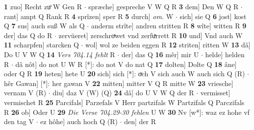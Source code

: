 \documentclass[8pt,a4paper,notitlepage]{article}
\begin{document}
\begin{table}[ht]
\begin{minipage}[t]{0.5\linewidth}
\textbf{1} zuo] Recht zuͦ W Gen R  $\cdot$ spræche] gespreche V W Q R \textbf{3} dem] Den W Q R  $\cdot$ rant] ampt Q Rank R \textbf{4} sprîzen] sper R \textbf{5} durch] \textit{om.} W  $\cdot$ sich] sie Q \textbf{6} jost] kost Q \textbf{7} sus] auch suß W als Q  $\cdot$ anderm strîte] andren stritten R \textbf{8} wîte] witten R \textbf{9} der] das Q do R  $\cdot$ zervüeret] zerschroͯwet vnd zerfuͯrrett R \textbf{10} und] Vnd auch W \textbf{11} scharpfen] starcken Q  $\cdot$ wol] wol ze beiden eggen R \textbf{12} striten] ritten W \textbf{13} dâ] Do U V W Q \textbf{14} \textit{Vers 704.14 fehlt} R   $\cdot$ der] das Q \textbf{16} mêr] mir U  $\cdot$ helde] helden R  $\cdot$ dâ nôt] do not U W R [*]: do not V do nat Q \textbf{17} dolten] Dolte Q \textbf{18} âne] oder Q R \textbf{19} heten] hete U \textbf{20} sich] sich [*]: oͮch V sich auch W auch sich Q (R)  $\cdot$ hêr Gawan] [*]: her gawan V \textbf{22} mitten] mitter V Q R mitte W \textbf{23} vriesche] vernam V (R)  $\cdot$ diu] daz V (W) (Q) \textbf{24} dâ] do U V W Q der R  $\cdot$ vermisset] vermischet R \textbf{25} Parcifals] Parzefals V Herr partzifals W Partzifals Q Parczifals R \textbf{26} ob] Oder U \textbf{29} \textit{Die Verse 704.29-30 fehlen} U W  \textbf{30} Nv [w*]: waz ez hohe vf den tag V  $\cdot$ ez hôhe] auch hoch Q (R)  $\cdot$ den] der R \newline
\end{minipage}
\end{table}
\end{document}
